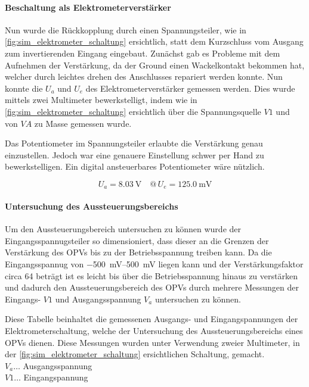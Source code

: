 \documentclass[12pt,english,ngerman]{scrartcl}
\begin{document}
\paragraph{Beschaltung als Elektrometerverstärker}
Nun wurde die Rückkopplung durch einen Spannungsteiler, wie in
\autoref{fig:sim_elektrometer_schaltung} ersichtlich, statt dem Kurzschluss vom
Ausgang zum invertierenden Eingang eingebaut. Zunächst gab es Probleme mit dem
Aufnehmen der Verstärkung, da der Ground einen Wackelkontakt bekommen hat,
welcher durch leichtes drehen des Anschlusses repariert werden konnte.
Nun konnte die $U_a$ und $U_e$ des Elektrometerverstärker gemessen werden. Dies
wurde mittels zwei Multimeter \cite{fluke175} bewerkstelligt, indem wie in
\autoref{fig:sim_elektrometer_schaltung} ersichtlich über die Spannungsquelle
$V1$ und von $VA$ zu Masse gemessen wurde.

Das Potentiometer im Spannungsteiler erlaubte die Verstärkung genau einzustellen.
Jedoch war eine genauere Einstellung schwer per Hand zu bewerkstelligen. Ein digital
ansteuerbares Potentiometer wäre nützlich.

\begin{equation}
  U_a = \SI{8.03}{\volt} \quad @\, U_e = \SI{125.0}{\milli\volt}
  \label{eq:messwert_elektro_ausgang_eingang}
\end{equation}

\paragraph{Untersuchung des Aussteuerungsbereichs} \label{sec:Versuchohnekond}
Um den Aussteuerungsbereich untersuchen zu können wurde der
Eingangsspannugsteiler so dimensioniert, dass dieser an die Grenzen der
Verstärkung des OPVs bis zu der Betriebsspannung treiben kann. Da die
Eingangsspannug von \SIrange{-500}{500}{\milli\volt} liegen kann und der Verstärkungsfaktor
circa \num{64} beträgt ist es leicht bis über die Betriebsspannung hinaus zu
verstärken und dadurch den Aussteuerungsbereich des OPVs durch mehrere
Messungen der Eingangs- $V1$ und Ausgangsspannung $V_a$ untersuchen zu können.


\begin{table}[H]
  \caption{Diese Tabelle beinhaltet die gemessenen Ausgangs- und
    Eingangspannungen der Elektrometerschaltung, welche der Untersuchung des
    Aussteuerungsbereichs eines OPVs\cite{uA741} dienen. Diese Messungen wurden
    unter Verwendung zweier Multimeter\cite{fluke175}, in der
    \autoref{fig:sim_elektrometer_schaltung} ersichtlichen Schaltung, gemacht.
    \\
  $V_a \dots$ Ausgangsspannung \\
  $V1 \dots$ Eingangspannung \\
  }
  \label{tab:mess_elektro_aussteurerung}
  \centering
\end{table}
\end{document}
